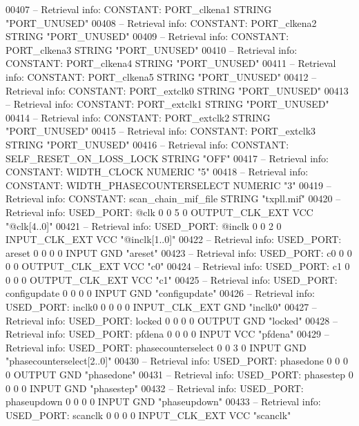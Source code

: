 \begin{DoxyCode}
{00407 \textcolor{keyword}{-- Retrieval info: CONSTANT: PORT\_clkena1 STRING "PORT\_UNUSED"}
00408 \textcolor{keyword}{-- Retrieval info: CONSTANT: PORT\_clkena2 STRING "PORT\_UNUSED"}
00409 \textcolor{keyword}{-- Retrieval info: CONSTANT: PORT\_clkena3 STRING "PORT\_UNUSED"}
00410 \textcolor{keyword}{-- Retrieval info: CONSTANT: PORT\_clkena4 STRING "PORT\_UNUSED"}
00411 \textcolor{keyword}{-- Retrieval info: CONSTANT: PORT\_clkena5 STRING "PORT\_UNUSED"}
00412 \textcolor{keyword}{-- Retrieval info: CONSTANT: PORT\_extclk0 STRING "PORT\_UNUSED"}
00413 \textcolor{keyword}{-- Retrieval info: CONSTANT: PORT\_extclk1 STRING "PORT\_UNUSED"}
00414 \textcolor{keyword}{-- Retrieval info: CONSTANT: PORT\_extclk2 STRING "PORT\_UNUSED"}
00415 \textcolor{keyword}{-- Retrieval info: CONSTANT: PORT\_extclk3 STRING "PORT\_UNUSED"}
00416 \textcolor{keyword}{-- Retrieval info: CONSTANT: SELF\_RESET\_ON\_LOSS\_LOCK STRING "OFF"}
00417 \textcolor{keyword}{-- Retrieval info: CONSTANT: WIDTH\_CLOCK NUMERIC "5"}
00418 \textcolor{keyword}{-- Retrieval info: CONSTANT: WIDTH\_PHASECOUNTERSELECT NUMERIC "3"}
00419 \textcolor{keyword}{-- Retrieval info: CONSTANT: scan\_chain\_mif\_file STRING "txpll.mif"}
00420 \textcolor{keyword}{-- Retrieval info: USED\_PORT: @clk 0 0 5 0 OUTPUT\_CLK\_EXT VCC "@clk[4..0]"}
00421 \textcolor{keyword}{-- Retrieval info: USED\_PORT: @inclk 0 0 2 0 INPUT\_CLK\_EXT VCC "@inclk[1..0]"}
00422 \textcolor{keyword}{-- Retrieval info: USED\_PORT: areset 0 0 0 0 INPUT GND "areset"}
00423 \textcolor{keyword}{-- Retrieval info: USED\_PORT: c0 0 0 0 0 OUTPUT\_CLK\_EXT VCC "c0"}
00424 \textcolor{keyword}{-- Retrieval info: USED\_PORT: c1 0 0 0 0 OUTPUT\_CLK\_EXT VCC "c1"}
00425 \textcolor{keyword}{-- Retrieval info: USED\_PORT: configupdate 0 0 0 0 INPUT GND "configupdate"}
00426 \textcolor{keyword}{-- Retrieval info: USED\_PORT: inclk0 0 0 0 0 INPUT\_CLK\_EXT GND "inclk0"}
00427 \textcolor{keyword}{-- Retrieval info: USED\_PORT: locked 0 0 0 0 OUTPUT GND "locked"}
00428 \textcolor{keyword}{-- Retrieval info: USED\_PORT: pfdena 0 0 0 0 INPUT VCC "pfdena"}
00429 \textcolor{keyword}{-- Retrieval info: USED\_PORT: phasecounterselect 0 0 3 0 INPUT GND "phasecounterselect[2..0]"}
00430 \textcolor{keyword}{-- Retrieval info: USED\_PORT: phasedone 0 0 0 0 OUTPUT GND "phasedone"}
00431 \textcolor{keyword}{-- Retrieval info: USED\_PORT: phasestep 0 0 0 0 INPUT GND "phasestep"}
00432 \textcolor{keyword}{-- Retrieval info: USED\_PORT: phaseupdown 0 0 0 0 INPUT GND "phaseupdown"}
00433 \textcolor{keyword}{-- Retrieval info: USED\_PORT: scanclk 0 0 0 0 INPUT\_CLK\_EXT VCC "scanclk"}
}
\end{DoxyCode}
